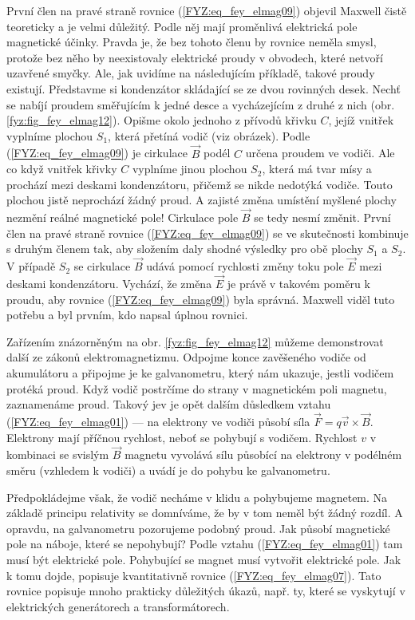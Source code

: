     První člen na pravé straně rovnice (\ref{FYZ:eq_fey_elmag09}) objevil Maxwell čistě teoreticky a je 
    velmi důležitý. Podle něj mají proměnlivá elektrická pole magnetické účinky. Pravda je, že bez tohoto 
    členu by rovnice neměla smysl, protože bez něho by neexistovaly elektrické proudy v obvodech, které 
    netvoří uzavřené smyčky. Ale, jak uvidíme na následujícím příkladě, takové proudy existují. Představme 
    si kondenzátor skládající se ze dvou rovinných desek. Nechť se nabíjí proudem směřujícím k jedné desce 
    a vycházejícím z druhé z nich (obr. \ref{fyz:fig_fey_elmag12}). Opišme okolo jednoho z přívodů křivku 
    \(C\), jejíž vnitřek vyplníme plochou \(S_1\), která přetíná vodič (viz obrázek). Podle 
    (\ref{FYZ:eq_fey_elmag09}) je cirkulace \(\vec{B}\) podél \(C\) určena proudem ve vodiči. Ale co když 
    vnitřek křivky \(C\) vyplníme jinou plochou \(S_2\), která má tvar mísy a prochází mezi deskami 
    kondenzátoru, přičemž se nikde nedotýká vodiče. Touto plochou jistě neprochází žádný proud. A zajisté 
    změna umístění myšlené plochy nezmění reálné magnetické pole! Cirkulace pole \(\vec{B}\) se tedy nesmí
    změnit. První člen na pravé straně rovnice (\ref{FYZ:eq_fey_elmag09}) se ve skutečnosti kombinuje s 
    druhým členem tak, aby složením daly shodné výsledky pro obě plochy \(S_1\) a \(S_2\). V případě 
    \(S_2\) se cirkulace \(\vec{B}\) udává pomocí rychlosti změny toku pole \(\vec{E}\) mezi deskami 
    kondenzátoru. Vychází, že změna \(\vec{E}\) je právě v takovém poměru k proudu, aby rovnice 
    (\ref{FYZ:eq_fey_elmag09}) byla správná. Maxwell viděl tuto potřebu a byl prvním, kdo napsal úplnou 
    rovnici.
        
    Zařízením znázorněným na obr. \ref{fyz:fig_fey_elmag12} můžeme demonstrovat další ze zákonů   
    elektromagnetizmu. Odpojme konce zavěšeného vodiče od akumulátoru a připojme je ke galvanometru, který 
    nám ukazuje, jestli vodičem protéká proud. Když vodič postrčíme do strany v magnetickém poli magnetu, 
    zaznamenáme proud. Takový jev je opět dalším důsledkem vztahu (\ref{FYZ:eq_fey_elmag01}) — na elektrony 
    ve vodiči působí síla \(\vec{F}=q\vec{v} \times\vec{B}\). Elektrony mají příčnou rychlost, neboť se 
    pohybují s vodičem. Rychlost \(v\) v kombinaci se svislým \(\vec{B}\) magnetu vyvolává sílu působící na 
    elektrony v podélném směru (vzhledem k vodiči) a uvádí je do pohybu ke galvanometru.      
    
    Předpokládejme však, že vodič necháme v klidu a pohybujeme magnetem. Na základě principu relativity se 
    domníváme, že by v tom neměl být žádný rozdíl. A opravdu, na galvanometru pozorujeme podobný proud. Jak 
    působí magnetické pole na náboje, které se nepohybují? Podle vztahu (\ref{FYZ:eq_fey_elmag01}) tam musí 
    být elektrické pole. Pohybující se magnet musí vytvořit elektrické pole. Jak k tomu dojde, popisuje 
    kvantitativně rovnice (\ref{FYZ:eq_fey_elmag07}). Tato rovnice popisuje mnoho prakticky důležitých 
    úkazů, např. ty, které se vyskytují v elektrických generátorech a transformátorech.
    
